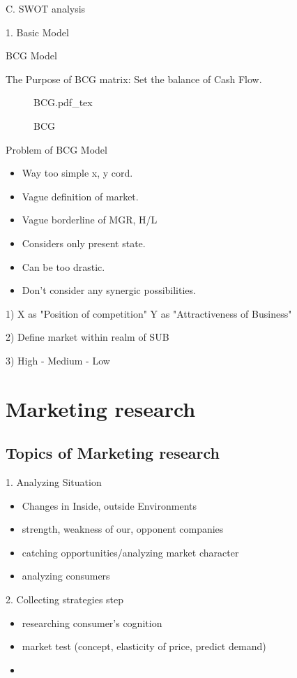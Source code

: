 \documentclass[12pt]{article}
\begin{document}
C. SWOT analysis

1. Basic Model

BCG Model

The Purpose of BCG matrix: Set the balance of Cash Flow.
\begin{figure}[H]
	\centering
	\def\svgwidth{\columnwidth}
	{BCG.pdf_tex}
	\caption{BCG}
	\label{fig:BCG Model}
\end{figure}

Problem of BCG Model

\begin{itemize}
  \item Way too simple x, y cord.
  \item Vague definition of market.
  \item Vague borderline of MGR, H/L
  \item Considers only present state.
  \item Can be too drastic.
  \item Don't consider any synergic possibilities.
\end{itemize}

1) X as "Position of competition" Y as "Attractiveness of Business"

2) Define market within realm of SUB

3) High - Medium - Low


\section{Marketing research}

\subsection{Topics of Marketing research}

1. Analyzing Situation
\begin{itemize}
	\item Changes in Inside, outside Environments
	\item strength, weakness of our, opponent companies
	\item catching opportunities/analyzing market character
	\item analyzing consumers
\end{itemize}

2. Collecting strategies step
\begin{itemize}
	\item researching consumer's cognition
	\item market test (concept, elasticity of price, predict demand)
	\item
\end{itemize}
\end{document}
